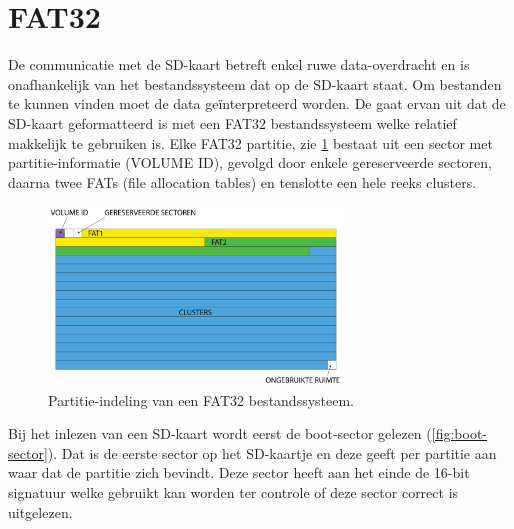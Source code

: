 %
%
%
\section{FAT32}

De communicatie met de SD-kaart betreft enkel ruwe data-overdracht en is onafhankelijk van het bestandssysteem dat op de SD-kaart staat. Om bestanden te kunnen vinden moet de data geïnterpreteerd worden. De \product gaat ervan uit dat de SD-kaart geformatteerd is met een FAT32 bestandssysteem welke relatief makkelijk te gebruiken is. Elke FAT32 partitie, zie \cref{fig:fat32-partition} bestaat uit een sector met partitie-informatie (VOLUME ID), gevolgd door enkele gereserveerde sectoren, daarna twee FATs (file allocation tables) en tenslotte een hele reeks clusters.

\begin{figure}[h!]
    \centering
    \includegraphics[width=0.70\textwidth]{img/fat32-partitie.png}
    \caption{Partitie-indeling van een FAT32 bestandssysteem.}
    \label{fig:fat32-partition}
\end{figure}

Bij het inlezen van een SD-kaart wordt eerst de boot-sector gelezen (\cref{fig:boot-sector}). Dat is de eerste sector op het SD-kaartje en deze geeft per partitie aan waar dat de partitie zich bevindt. Deze sector heeft aan het einde de 16-bit signatuur  welke gebruikt kan worden ter controle of deze sector correct is uitgelezen.

